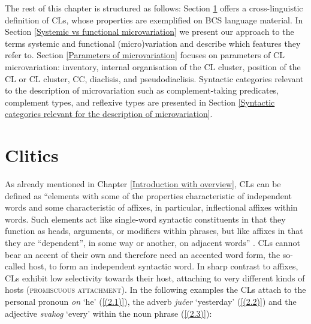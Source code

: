 The rest of this chapter is structured as follows: Section \ref{Clitics} offers a cross-linguistic definition of CLs, whose properties are exemplified on BCS language material. In Section \ref{Systemic vs functional microvariation} we present our approach to the terms systemic and functional (micro)variation and describe which features they refer to. Section \ref{Parameters of microvariation} focuses on parameters of CL microvariation: inventory, internal organisation of the CL cluster, position of the CL or CL cluster, CC, diaclisis, and pseudodiaclisis. Syntactic categories relevant to the description of microvariation such as complement-taking predicates, complement types, and reflexive types are presented in Section \ref{Syntactic categories relevant for the description of microvariation}. 


\section{Clitics}
\label{Clitics}
\largerpage[2]

As already mentioned in Chapter \ref{Introduction with overview}, CLs can be defined as ``elements with some of the properties characteristic of independent words and some characteristic of affixes, in particular, inflectional affixes within words. Such elements act like single-word syntactic constituents in that they function as heads, arguments, or modifiers within phrases, but like affixes in that they are ``dependent'', in some way or another, on adjacent words'' \citep[xii]{Zwicky94}. CLs cannot bear an accent of their own and therefore need an accented word form, the so-called host, to form an independent syntactic word. In sharp contrast to affixes, CLs exhibit low selectivity towards their host, attaching to very different kinds of hosts (\textsc{promiscuous attachment}). In the following examples the CLs attach to the personal pronoun \textit{on} ‘he’ (\ref{(2.1)}), the adverb \textit{jučer} ‘yesterday’ (\ref{(2.2)}) and the adjective \textit{svakog} ‘every’ within the noun phrase (\ref{(2.3)}):

